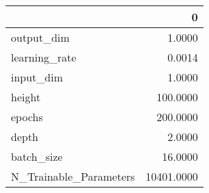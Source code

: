 \begin{tabular}{lr}
\toprule
{} &           0 \\
\midrule
output\_dim             &      1.0000 \\
learning\_rate          &      0.0014 \\
input\_dim              &      1.0000 \\
height                 &    100.0000 \\
epochs                 &    200.0000 \\
depth                  &      2.0000 \\
batch\_size             &     16.0000 \\
N\_Trainable\_Parameters &  10401.0000 \\
\bottomrule
\end{tabular}
